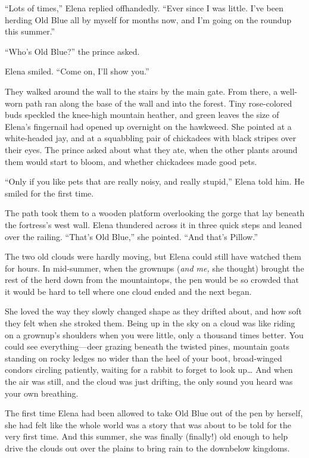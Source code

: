 \documentclass[10pt]{book}
\begin{document}
``Lots of times,'' Elena replied offhandedly. ``Ever since I was little. I've been herding Old Blue all by myself for months now, and I'm going on the roundup this summer.''

``Who's Old Blue?'' the prince asked.

Elena smiled. ``Come on, I'll show you.''

They walked around the wall to the stairs by the main gate. From there, a well-worn path ran along the base of the wall and into the forest. Tiny rose-colored buds speckled the knee-high mountain heather, and green leaves the size of Elena's fingernail had opened up overnight on the hawkweed. She pointed at a white-headed jay, and at a squabbling pair of chickadees with black stripes over their eyes. The prince asked about what they ate, when the other plants around them would start to bloom, and whether chickadees made good pets.

``Only if you like pets that are really noisy, and really stupid,'' Elena told him. He smiled for the first time.

The path took them to a wooden platform overlooking the gorge that lay beneath the fortress's west wall. Elena thundered across it in three quick steps and leaned over the railing. ``That's Old Blue,'' she pointed. ``And that's Pillow.''

The two old clouds were hardly moving, but Elena could still have watched them for hours. In mid-summer, when the grownups (\emph{and me,} she thought) brought the rest of the herd down from the mountaintops, the pen would be so crowded that it would be hard to tell where one cloud ended and the next began.

She loved the way they slowly changed shape as they drifted about, and how soft they felt when she stroked them. Being up in the sky on a cloud was like riding on a grownup's shoulders when you were little, only a thousand times better. You could see everything---deer grazing beneath the twisted pines, mountain goats standing on rocky ledges no wider than the heel of your boot, broad-winged condors circling patiently, waiting for a rabbit to forget to look up{\ldots} And when the air was still, and the cloud was just drifting, the only sound you heard was your own breathing.

The first time Elena had been allowed to take Old Blue out of the pen by herself, she had felt like the whole world was a story that was about to be told for the very first time. And this summer, she was finally (finally!) old enough to help drive the clouds out over the plains to bring rain to the downbelow kingdoms.
\end{document}
